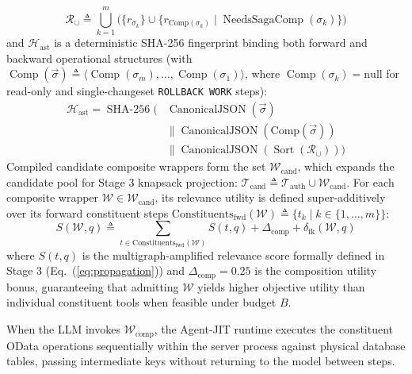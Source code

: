 \documentclass[conference,10pt]{IEEEtran}
\begin{document}
\begin{equation}
\mathcal{R}_{\cup} \triangleq \bigcup_{k=1}^m \Big( \{r_{\sigma_k}\} \cup \{r_{\text{Comp}(\sigma_k)} \mid \operatorname{NeedsSagaComp}(\sigma_k)\} \Big)
\end{equation}
and $\mathcal{H}_{\text{ast}}$ is a deterministic SHA-256 fingerprint binding both forward and backward operational structures (with $\operatorname{Comp}(\vec{\sigma}) \triangleq \langle \operatorname{Comp}(\sigma_m), \dots, \operatorname{Comp}(\sigma_1) \rangle$, where $\operatorname{Comp}(\sigma_k) = \text{null}$ for read-only and single-changeset \texttt{ROLLBACK WORK} steps):
\begin{equation}
\begin{aligned}
\mathcal{H}_{\text{ast}} = \operatorname{SHA-256}\Big(&\operatorname{CanonicalJSON}(\vec{\sigma}) \\
&\parallel \operatorname{CanonicalJSON}(\text{Comp}(\vec{\sigma})) \\
&\parallel \operatorname{CanonicalJSON}(\operatorname{Sort}(\mathcal{R}_{\cup}))\Big)
\end{aligned}
\end{equation}
Compiled candidate composite wrappers form the set $\mathcal{W}_{\text{cand}}$, which expands the candidate pool for Stage 3 knapsack projection: $\mathcal{T}_{\text{cand}} \triangleq \mathcal{T}_{\text{auth}} \cup \mathcal{W}_{\text{cand}}$. For each composite wrapper $\mathcal{W} \in \mathcal{W}_{\text{cand}}$, its relevance utility is defined super-additively over its forward constituent steps $\text{Constituents}_{\text{fwd}}(\mathcal{W}) \triangleq \{t_k \mid k \in \{1, \dots, m\}\}$:
\begin{equation}
\label{eq:comp_score}
S(\mathcal{W}, q) \triangleq \sum_{t \in \text{Constituents}_{\text{fwd}}(\mathcal{W})} S(t, q) + \Delta_{\text{comp}} + \delta_{\text{fk}}(\mathcal{W}, q)
\end{equation}
where $S(t, q)$ is the multigraph-amplified relevance score formally defined in Stage 3 (Eq.~(\ref{eq:propagation})) and $\Delta_{\text{comp}} = 0.25$ is the composition utility bonus, guaranteeing that admitting $\mathcal{W}$ yields higher objective utility than individual constituent tools when feasible under budget $B$.

When the LLM invokes $\mathcal{W}_{\text{comp}}$, the Agent-JIT runtime executes the constituent OData operations sequentially within the server process against physical database tables, passing intermediate keys without returning to the model between steps.
\end{document}
